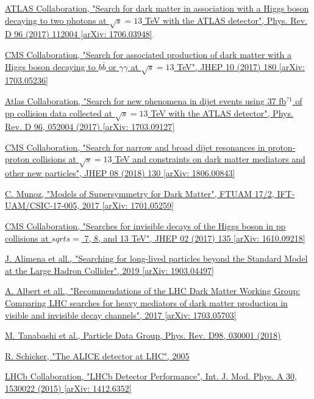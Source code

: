 \documentclass[a4paper, 10pt, openright]{report}
\begin{document}
\begin{thebibliography}{1}
\href{https://arxiv.org/abs/1706.03948}{ATLAS Collaboration,
"Search for dark matter in association with a Higgs boson decaying to two photons at $\sqrt{s} = 13$ TeV with the ATLAS detector",
Phys. Rev. D 96 (2017) 112004 [arXiv: 1706.03948]
}

\href{https://arxiv.org/abs/1703.05236}{CMS Collaboration,
"Search for associated production of dark matter with a Higgs boson decaying to $b \bar b$ or $\gamma \gamma$ at $\sqrt{s} = 13$ TeV",
JHEP 10 (2017) 180 [arXiv: 1703.05236]
}

\href{https://arxiv.org/abs/1703.09127}{Atlas Collaboration,
"Search for new phenomena in dijet events using 37 fb$^{?1}$ of pp collision data collected at $\sqrt{s} = 13$ TeV with the ATLAS detector",
Phys. Rev. D 96, 052004 (2017) [arXiv: 1703.09127]
}

\href{https://arxiv.org/abs/1806.00843}{CMS Collaboration,
"Search for narrow and broad dijet resonances in proton-proton collisions at $\sqrt{s} = 13$ TeV and constraints on dark matter mediators and other new particles",
JHEP 08 (2018) 130 [arXiv: 1806.00843]
}

\href{https://arxiv.org/abs/1701.05259}{C. Munoz,
"Models of Supersymmetry for Dark Matter",
FTUAM 17/2, IFT-UAM/CSIC-17-005, 2017 [arXiv: 1701.05259]
}

\href{https://arxiv.org/abs/1610.09218}{CMS Collaboration,
"Searches for invisible decays of the Higgs boson in pp collisions at $sqrt{s} =$ 7, 8, and 13 TeV",
JHEP 02 (2017) 135 [arXiv: 1610.09218]
}

\href{https://arxiv.org/abs/1903.04497?}{J. Alimena et all.,
"Searching for long-lived particles beyond the Standard Model at the Large Hadron Collider",
2019 [arXiv: 1903.04497]
}

\href{https://arxiv.org/abs/1703.05703}{A. Albert et all.,
"Recommendations of the LHC Dark Matter Working Group: Comparing LHC searches for heavy mediators of dark matter production in visible and invisible decay channels",
2017 [arXiv: 1703.05703]
}

\href{http://pdg.lbl.gov/}{M. Tanabashi et al.,
Particle Data Group,
Phys. Rev. D98, 030001 (2018)}

\href{https://arxiv.org/abs/hep-ph/0509259}{R. Schicker,
"The ALICE detector at LHC",
2005
}

\href{https://arxiv.org/abs/1412.6352}{LHCb Collaboration,
"LHCb Detector Performance",
Int. J. Mod. Phys. A 30, 1530022 (2015) [arXiv: 1412.6352]
}


\end{thebibliography}
\end{document}
